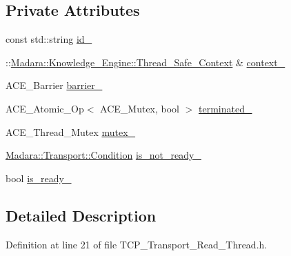 \subsection*{Private Attributes}
\begin{DoxyCompactItemize}
\item 
const std::string \hyperlink{classMadara_1_1Transport_1_1TCP__Transport__Read__Thread_ad33ffb6e972d5e04a508430d0ac788d5}{id\_\-}
\item 
::\hyperlink{classMadara_1_1Knowledge__Engine_1_1Thread__Safe__Context}{Madara::Knowledge\_\-Engine::Thread\_\-Safe\_\-Context} \& \hyperlink{classMadara_1_1Transport_1_1TCP__Transport__Read__Thread_ab9bb1f237e3fdb0e0a99fb78689c49aa}{context\_\-}
\item 
ACE\_\-Barrier \hyperlink{classMadara_1_1Transport_1_1TCP__Transport__Read__Thread_a2771ac66938322442de3abbd67338134}{barrier\_\-}
\item 
ACE\_\-Atomic\_\-Op$<$ ACE\_\-Mutex, bool $>$ \hyperlink{classMadara_1_1Transport_1_1TCP__Transport__Read__Thread_a1ab73986d8410ec4472352fa5de6b3e7}{terminated\_\-}
\item 
ACE\_\-Thread\_\-Mutex \hyperlink{classMadara_1_1Transport_1_1TCP__Transport__Read__Thread_a3a3a324aa224f19bac886f5ef43c683f}{mutex\_\-}
\item 
\hyperlink{namespaceMadara_1_1Transport_a5dd6d9a7fb47cdbf2d1448242da4e13d}{Madara::Transport::Condition} \hyperlink{classMadara_1_1Transport_1_1TCP__Transport__Read__Thread_af1d33337d547d2057e55cfebbdc97f35}{is\_\-not\_\-ready\_\-}
\item 
bool \hyperlink{classMadara_1_1Transport_1_1TCP__Transport__Read__Thread_aa2aab22d67d2ea2c58df58aa55fd506f}{is\_\-ready\_\-}
\end{DoxyCompactItemize}


\subsection{Detailed Description}


Definition at line 21 of file TCP\_\-Transport\_\-Read\_\-Thread.h.




